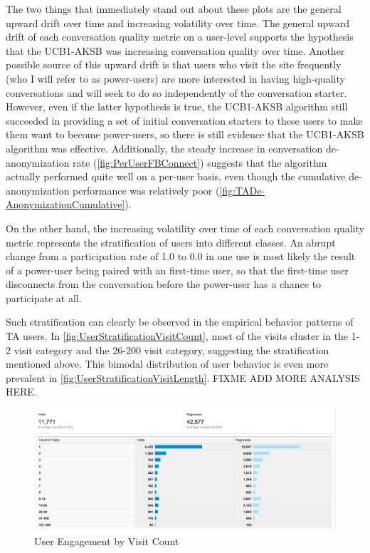 The two things that immediately stand out about these plots are the general upward drift over time and increasing volatility over time. The general upward drift of each conversation quality metric on a user-level supports the hypothesis that the UCB1-AKSB was increasing conversation quality over time. Another possible source of this upward drift is that users who visit the site frequently (who I will refer to as power-users) are more interested in having high-quality conversations and will seek to do so independently of the conversation starter. However, even if the latter hypothesis is true, the UCB1-AKSB algorithm still succeeded in providing a set of initial conversation starters to these users to make them want to become power-users, so there is still evidence that the UCB1-AKSB algorithm was effective. Additionally, the steady increase in conversation de-anonymization rate (\autoref{fig:PerUserFBConnect}) suggests that the algorithm actually performed quite well on a per-user basis, even though the cumulative de-anonymization performance was relatively poor (\autoref{fig:TADe-AnonymizationCumulative}).

On the other hand, the increasing volatility over time of each conversation quality metric represents the stratification of users into different classes. An abrupt change from a participation rate of 1.0 to 0.0 in one use is most likely the result of a power-user being paired with an first-time user, so that the first-time user disconnects from the conversation before the power-user has a chance to participate at all.

Such stratification can clearly be observed in the empirical behavior patterns of TA users. In \autoref{fig:UserStratificationVisitCount}, most of the visits cluster in the 1-2 visit category and the 26-200 visit category, suggesting the stratification mentioned above. This bimodal distribution of user behavior is even more prevalent in \autoref{fig:UserStratificationVisitLength}. FIXME ADD MORE ANALYSIS HERE.

\begin{figure}[H]
\centering
\includegraphics[trim= 0mm 0mm 0mm 0mm, clip, scale=0.3]{./Figures/UserStratificationVisitCount}
\caption{User Engagement by Visit Count}
\label{fig:UserStratificationVisitCount}
\end{figure}

